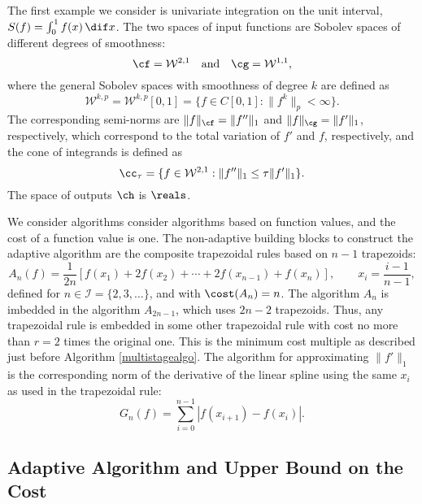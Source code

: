 The first example we consider is univariate integration on the unit interval, $S(f)=\int_{0}^{1}f(x) \, \dif x$.  The two spaces of input functions are Sobolev spaces of different degrees of smoothness:
\begin{equation*}
  \cf=\mathcal{W}^{2,1} \quad \text{and} \quad
  \cg=\mathcal{W}^{1,1},
\end{equation*}
where the general Sobolev spaces with smoothness of degree $k$ are defined as 
\begin{equation} \label{defSobolev}
  \mathcal{W}^{k,p}=\mathcal{W}^{k,p}[0,1]=\{f\in C[0,1]: \|f^{k}\|_{p}<\infty\}.
\end{equation}
The corresponding semi-norms are $\|f\|_{\cf}=\|f''\|_{1}$ and $\|f\|_{\cg}=\|f'\|_{1}$, respectively, which correspond to the total variation of $f'$ and $f$, respectively,  and the cone of integrands is defined as  
\begin{equation}\label{coneinteg}
\cc_{\tau}=\{f\in \mathcal{W}^{2,1}:\|f''\|_1\leq\tau\|f'\|_1\}.
\end{equation}
The space of outputs $\ch$ is $\reals$.

We consider algorithms consider algorithms based on function values, and the cost of a function value is one.  The non-adaptive building blocks to construct the adaptive algorithm are the composite trapezoidal rules based on $n-1$ trapezoids:
\begin{equation*}
    A_{n}(f)
    =\frac{1}{2n}[f(x_1)+2f(x_2)+\cdots+2f(x_{n-1})+f(x_n)], \qquad x_i=\frac{i-1}{n-1},
\end{equation*}
defined for $n \in \mathcal{I}=\{2,3,\ldots\}$, and with $\cost(A_n)=n$.  The algorithm $A_n$ is imbedded in the algorithm $A_{2n-1}$, which uses $2n-2$ trapezoids.  Thus, any trapezoidal rule is embedded in some other trapezoidal rule with cost no more than $r=2$ times the original one.  This is the minimum cost multiple as described just before Algorithm \ref{multistagealgo}.  
The algorithm for approximating $\|f'\|_{1}$ is the corresponding norm of the derivative of the linear spline using the same $x_i$ as used in the trapezoidal rule:
\begin{equation}\label{1direst}
    G_n(f)=\sum_{i=0}^{n-1}\left|f(x_{i+1})-f(x_{i})\right|.
\end{equation} 

\subsection{Adaptive Algorithm and Upper Bound on the Cost}

